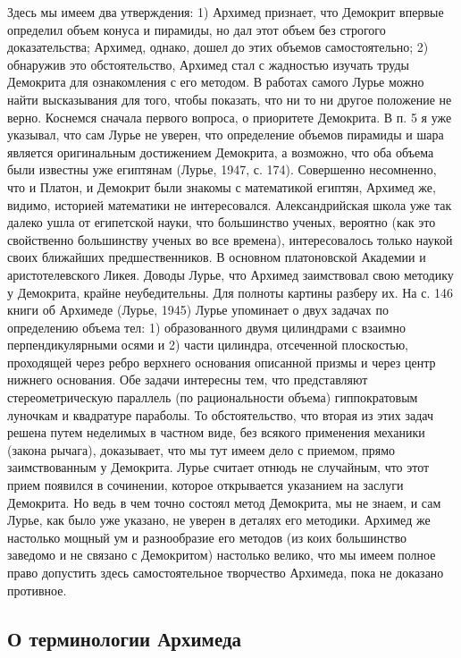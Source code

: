 Здесь  мы имеем  два утверждения:  1) Архимед  признает, что  Демокрит
впервые  определил объем  конуса и  пирамиды,  но дал  этот объем  без
строгого  доказательства;  Архимед,  однако,  дошел  до  этих  объемов
самостоятельно;  2)  обнаружив  это  обстоятельство,  Архимед  стал  с
жадностью  изучать труды  Демокрита  для ознакомления  с его  методом.
В  работах  самого Лурье  можно  найти  высказывания для  того,  чтобы
показать, что  ни то  ни другое положение  не верно.  Коснемся сначала
первого  вопроса, о  приоритете  Демокрита.  В п.  5  я уже  указывал,
что  сам Лурье  не уверен,  что  определение объемов  пирамиды и  шара
является  оригинальным  достижением  Демокрита, а  возможно,  что  оба
объема были известны  уже египтянам (Лурье, 1947,  с. 174). Совершенно
несомненно,  что  и Платон,  и  Демокрит  были знакомы  с  математикой
египтян,  Архимед же,  видимо, историей  математики не  интересовался.
Александрийская  школа  уже  так  далеко  ушла  от  египетской  науки,
что  большинство ученых,  вероятно  (как  это свойственно  большинству
ученых во  все времена), интересовалось только  наукой своих ближайших
предшественников. В основном  платоновской Академии и аристотелевского
Ликея.  Доводы   Лурье,  что  Архимед  заимствовал   свою  методику  у
Демокрита, крайне неубедительны. Для полноты картины разберу их. На с.
146 книги об Архимеде (Лурье, 1945)  Лурье упоминает о двух задачах по
определению объема  тел: 1)  образованного двумя цилиндрами  с взаимно
перпендикулярными осями  и 2)  части цилиндра,  отсеченной плоскостью,
проходящей  через ребро  верхнего основания  описанной призмы  и через
центр нижнего  основания. Обе  задачи интересны тем,  что представляют
стереометрическую параллель  (по рациональности  объема) гиппократовым
луночкам и квадратуре параболы. То  обстоятельство, что вторая из этих
задач решена  путем неделимых в  частном виде, без  всякого применения
механики (закона рычага), доказывает, что мы тут имеем дело с приемом,
прямо заимствованным  у Демокрита. Лурье считает  отнюдь не случайным,
что этот прием появился в  сочинении, которое открывается указанием на
заслуги Демокрита. Но ведь в чем  точно состоял метод Демокрита, мы не
знаем, и  сам Лурье,  как было  уже указано, не  уверен в  деталях его
методики. Архимед  же настолько мощный  ум и разнообразие  его методов
(из коих  большинство заведомо  и не  связано с  Демокритом) настолько
велико,  что мы  имеем  полное право  допустить здесь  самостоятельное
творчество Архимеда, пока не доказано противное.

\subsection{О терминологии Архимеда}

